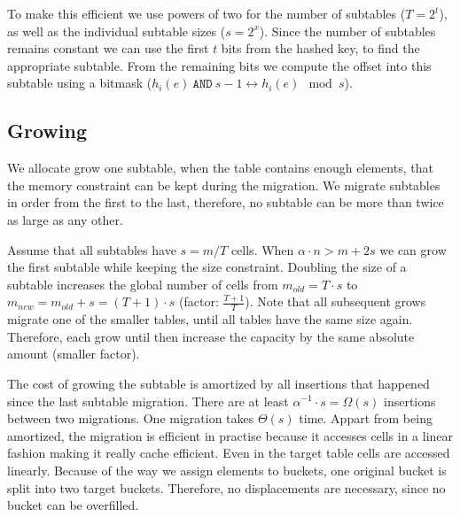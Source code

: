 \documentclass[a4paper,UKenglish]{lipics-v2016}
\begin{document}
To make this efficient we use powers of two for the number of
subtables ($T = 2^t$), as well as the individual subtable sizes ($s =
2^x$).  Since the number of subtables remains constant we can use the
first $t$ bits from the hashed key, to find the appropriate subtable.
From the remaining bits we compute the offset into this subtable using
a bitmask ($h_i(e)~\texttt{AND}~s-1 \leftrightarrow h_i(e) \mod s$).



\subsection{Growing}
We allocate grow one subtable,
when the table contains enough elements, that the memory constraint
can be kept during the migration.  We migrate subtables in order
from the first to the last, therefore, no subtable can be more than
twice as large as any other.

Assume that all subtables have $s=m/T$ cells. When $\alpha\cdot n >
m+2s$ we can grow the first subtable while keeping the size
constraint.  Doubling the size of a subtable increases the global
number of cells from $m_{old} = T\cdot s$ to $m_{new} = m_{old}+s =
(T+1)\cdot s$ (factor: $\frac{T+1}{T}$).  Note that all subsequent
grows migrate one of the smaller tables, until all tables have the
same size again.  Therefore, each grow until then increase the
capacity by the same absolute amount (smaller factor).

The cost of growing the subtable is amortized by all insertions that
happened since the last subtable migration.  There are at least
$\alpha^{-1} \cdot s = \Omega(s)$ insertions between two migrations.
One migration takes $\Theta(s)$ time.  Appart from being amortized,
the migration is efficient in practise because it accesses cells in a
linear fashion making it really cache efficient.  Even in the target
table cells are accessed linearly.  Because of the way we assign
elements to buckets, one original bucket is split into two target
buckets.  Therefore, no displacements are necessary, since no bucket
can be overfilled.
\end{document}
